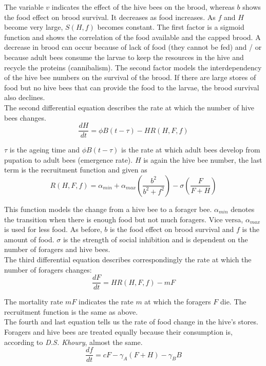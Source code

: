 	The variable $v$ indicates the effect of the hive bees on the brood, whereas $b$ shows the food effect on brood survival. It decreases as food increases. As $f$ and $H$ become very large, $S(H,f)$ becomes constant. The first factor is a sigmoid function and shows the correlation of the food available and the capped brood. A decrease in brood can occur because of lack of food (they cannot be fed) and / or because adult bees consume the larvae to keep the resources in the hive and recycle the proteins (cannibalism). The second factor models the interdependency of the hive bee numbers on the survival of the brood. If there are large stores of food but no hive bees that can provide the food to the larvae, the brood survival also declines.  
	\\
	The second differential equation describes the rate at which the number of hive bees changes.	
	\begin{equation}\label{eq:changeHiveBees}
		\frac{dH}{dt}=\phi B(t-\tau)-HR(H,F,f)
	\end{equation}
	
	$\tau$ is the ageing time and $\phi B(t-\tau)$ is the rate at which adult bees develop from pupation to adult bees (emergence rate). $H$ is again the hive bee number, the last term is the recruitment function and given as		
		\begin{equation}\label{eq:recruitmentFunction}
			R(H,F,f) = \alpha_{min} + \alpha_{max}(\frac{b^2}{b^2+f^2})-\sigma(\frac{F}{F+H})
		\end{equation}
				
	This function models the change from a hive bee to a forager bee. $\alpha_{min}$ denotes the transition when there is enough food but not much foragers. Vice versa, $\alpha_{max}$ is used for less food. As before, $b$ is the food effect on brood survival and $f$ is the amount of food. $\sigma$ is the strength of social inhibition and is dependent on the number of foragers and hive bees.\\
	The third differential equation describes correspondingly the rate at which the number of foragers changes:	
	\begin{equation}\label{eq:changeForagers}
		\frac{dF}{dt} = HR(H,F,f)-m F
	\end{equation}
	
	The mortality rate $mF$ indicates the rate $m$ at which the foragers $F$ die. The recruitment function is the same as above.\\	
	The fourth and last equation tells us the rate of food change in the hive's stores. Foragers and hive bees are treated equally because their consumption is, according to \textit{D.S. Khoury}, almost the same. 	
	\begin{equation}\label{eq:changeFoodStoreConst}
		\frac{df}{dt} = c F - \gamma_A (F+H) - \gamma_B B
	\end{equation}
	
